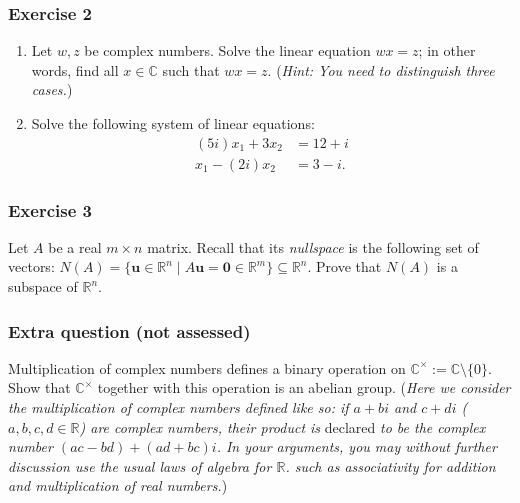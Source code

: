\documentclass[
  12pt,
  a4paper,
  twoside]{article}
\theoremstyle{plain}
\theoremstyle{definition}
\begin{document}
\hypertarget{exercise-2}{%
\subsubsection*{Exercise 2}\label{exercise-2}}

\begin{enumerate}
\def\labelenumi{(\alph{enumi})}
\item
  Let \(w,z\) be complex numbers. Solve the linear equation \(wx=z\); in other
  words, find all \(x\in\mathbb{C}\) such that \(wx=z\). (\emph{Hint: You need to
  distinguish three cases.})
\item
  Solve the following system of linear equations: \begin{align*} (5i)x_1 +
  3x_2 &= 12+i\\ x_1 - (2i)x_2 &= 3-i. \end{align*}
\end{enumerate}

\hypertarget{exercise-3}{%
\subsubsection*{Exercise 3}\label{exercise-3}}

Let \(A\) be a real \(m\times n\) matrix. Recall that its \emph{nullspace} is the
following set of vectors: \(N(A) = \{ \mathbf{u}\in \mathbb{R}^n \mid A\mathbf{u} = \mathbf{0} \in \mathbb{R}^m\} \subseteq \mathbb{R}^n\). Prove that
\(N(A)\) is a subspace of \(\mathbb{R}^n\).

\hypertarget{extra-question-not-assessed}{%
\subsubsection*{Extra question (not assessed)}\label{extra-question-not-assessed}}

Multiplication of complex numbers defines a binary operation on
\(\mathbb{C}^\times := \mathbb{C}\setminus\{0\}\). Show that \(\mathbb{C}^\times\)
together with this operation is an abelian group. (\emph{Here we consider the
multiplication of complex numbers defined like so: if \(a+bi\) and \(c+di\)
(\(a,b,c,d\in\mathbb{R}\)) are complex numbers, their product is} declared \emph{to be
the complex number \((ac-bd) + (ad+bc)i\). In your arguments, you may without
further discussion use the usual laws of algebra for \(\mathbb{R}\). such as
associativity for addition and multiplication of real numbers.})
\end{document}
